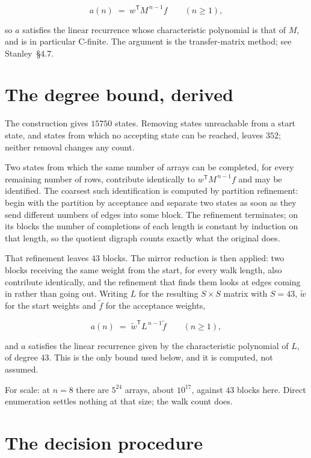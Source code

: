 \documentclass[11pt]{article}
\theoremstyle{definition}
\begin{document}
\[a(n) \;=\; w^{\mathsf T} M^{\,n-1} f \qquad (n \ge 1),\]

so $a$ satisfies the linear recurrence whose characteristic polynomial is that of $M$, and is in particular C-finite. The argument is the transfer-matrix method; see Stanley~\S4.7.

\section{The degree bound, derived}

The construction gives $15750$ states. Removing states unreachable from a start state, and states from which no accepting state can be reached, leaves $352$; neither removal changes any count.

Two states from which the same number of arrays can be completed, for every remaining number of rows, contribute identically to $w^{\mathsf T}M^{\,n-1}f$ and may be identified. The coarsest such identification is computed by partition refinement: begin with the partition by acceptance and separate two states as soon as they send different numbers of edges into some block. The refinement terminates; on its blocks the number of completions of each length is constant by induction on that length, so the quotient digraph counts exactly what the original does.

That refinement leaves $43$ blocks. The mirror reduction is then applied: two blocks receiving the same weight from the start, for every walk length, also contribute identically, and the refinement that finds them looks at edges coming in rather than going out. Writing $L$ for the resulting $S \times S$ matrix with $S = 43$, $\tilde w$ for the start weights and $\tilde f$ for the acceptance weights,

\[a(n) \;=\; \tilde w^{\mathsf T} L^{\,n-1} \tilde f \qquad (n \ge 1),\]

and $a$ satisfies the linear recurrence given by the characteristic polynomial of $L$, of degree $43$. This is the only bound used below, and it is computed, not assumed.

For scale: at $n = 8$ there are $5^{24}$ arrays, about $10^{17}$, against $43$ blocks here. Direct enumeration settles nothing at that size; the walk count does.

\section{The decision procedure}
\end{document}
